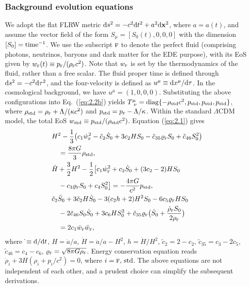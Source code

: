 \documentclass[aps,prd,twocolumn]{revtex4-2}
\newcommand\dx{{\rm d}}
\newcommand\subF{\textsc{f}}
\newcommand\substd{{\rm std}}
\begin{document}
\subsubsection{Background evolution equations}\label{sec:III.A.1}
We adopt the flat FLRW metric $\dx s^2=-c^2\dx t^2+a^2\dx\mathbf{x}^2$, where $a=a(t)$, and assume the vector field of the form $S_\mu=[S_0(t),0,0,0]$ with the dimension $[S_0]={\rm time}^{-1}$. We use the subscript $\subF$ to denote the perfect fluid (comprising photons, neutrinos, baryons and dark matter for the EDE purpose), with its EoS given by $w_\subF(t)\equiv p_\subF/(\rho_\subF c^2)$. Note that $w_\subF$ is set by the thermodynamics of the fluid, rather than a free scalar. The fluid proper time is defined through $\dx s^2=-c^2\dx\tau^2$, and the four-velocity is defined as $u^\mu\equiv\dx x^\mu/\dx\tau$. In the cosmological background, we have $u^\mu=(1,0,0,0)$. Substituting the above configurations into Eq.~(\ref{eq:2.2b}) yields $T^\mu_{\ \nu}={\rm diag}\{-\rho_\substd c^2,p_\substd,p_\substd,p_\substd\}$, where $\rho_\substd=\rho_\subF+\Lambda/(\kappa c^2)$ and $p_\substd=p_\subF-\Lambda/\kappa$. Within the standard $\Lambda$CDM model, the total EoS $w_\substd\equiv p_\substd/(\rho_\substd c^2)$. Equation (\ref{eq:2.1}) gives
\begin{subequations}\label{eq:3.1}
\begin{align}
  & H^2-\frac{1}{3}\big(c_1\dot{w}_\subF^2 - \tilde{c}_2\dot{S}_0 + 3c_2HS_0 - \tilde{c}_{35}\varrho_\subF S_0 + \tilde{c}_{46}S_0^2\big) \nonumber\\
  & \quad = \frac{8\pi G}{3}\rho_\substd, \label{eq:3.1a}\\
  & \dot{H}+\frac{3}{2}H^2-\frac{1}{2}\big[c_1\dot{w}_\subF^2 + c_2\dot{S}_0 + (3c_2-2)HS_0 \nonumber\\
  & \quad - c_3\varrho_\subF S_0 + c_4S_0^2\big] = -\frac{4\pi G}{c^2}p_\substd, \label{eq:3.1b}\\
  & \tilde{c}_2\ddot{S}_0 + 3\tilde{c}_2H\dot{S}_0 - 3(c_2h+2)H^2S_0 - 6c_5\varrho_\subF HS_0 \nonumber\\
  & \quad - 2\tilde{c}_{46}S_0\dot{S}_0 + 3c_6HS_0^2 + \tilde{c}_{35}\varrho_\subF\big(\dot{S}_0+\frac{\dot{\rho}_\subF S_0}{2\rho_\subF}\big) \nonumber\\
  & \quad = 2c_1\dot{w}_\subF\ddot{w}_\subF, \label{eq:3.1c}
\end{align}
\end{subequations}
where $\dot{}\equiv\dx/\dx t$, $H=\dot{a}/a$, $\dot{H} = \ddot{a}/a-H^2$, $h=\dot{H}/H^2$, $\tilde{c}_2=2-c_2$, $\tilde{c}_{35}=c_3-2c_5$, $\tilde{c}_{46}=c_4-c_6$, $\varrho_\subF=\sqrt{8\pi G\rho_\subF}$. Energy conservation equation reads $\dot{\rho}_i+3H(\rho_i+p_i/c^2)=0$, where $i=\subF,\,\substd$. The above equations are not independent of each other, and a prudent choice can simplify the subsequent derivations.
\end{document}
